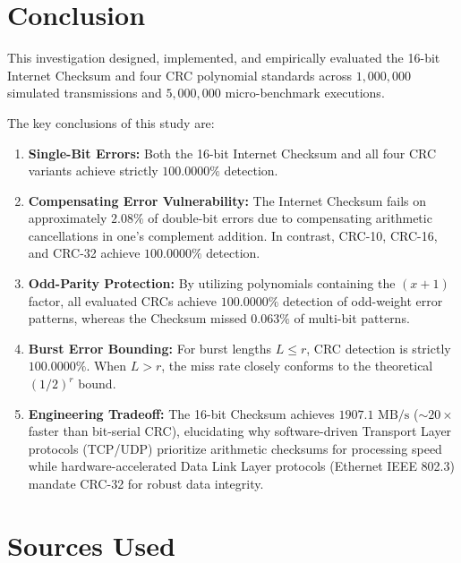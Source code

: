 \documentclass[11pt,a4paper]{article}
\begin{document}
\enlargethispage{2\baselineskip}
\section{Conclusion}

This investigation designed, implemented, and empirically evaluated the 16-bit Internet Checksum and four CRC polynomial standards across $1{,}000{,}000$ simulated transmissions and $5{,}000{,}000$ micro-benchmark executions.

The key conclusions of this study are:
\begin{enumerate}
    \item \textbf{Single-Bit Errors:} Both the 16-bit Internet Checksum and all four CRC variants achieve strictly $100.0000\%$ detection.
    \item \textbf{Compensating Error Vulnerability:} The Internet Checksum fails on approximately $2.08\%$ of double-bit errors due to compensating arithmetic cancellations in one's complement addition. In contrast, CRC-10, CRC-16, and CRC-32 achieve $100.0000\%$ detection.
    \item \textbf{Odd-Parity Protection:} By utilizing polynomials containing the $(x + 1)$ factor, all evaluated CRCs achieve $100.0000\%$ detection of odd-weight error patterns, whereas the Checksum missed $0.063\%$ of multi-bit patterns.
    \item \textbf{Burst Error Bounding:} For burst lengths $L \le r$, CRC detection is strictly $100.0000\%$. When $L > r$, the miss rate closely conforms to the theoretical $(1/2)^r$ bound.
    \item \textbf{Engineering Tradeoff:} The 16-bit Checksum achieves $1907.1\text{ MB/s}$ ($\sim 20\times$ faster than bit-serial CRC), elucidating why software-driven Transport Layer protocols (TCP/UDP) prioritize arithmetic checksums for processing speed while hardware-accelerated Data Link Layer protocols (Ethernet IEEE 802.3) mandate CRC-32 for robust data integrity.
\end{enumerate}

\section{Sources Used}
\end{document}
